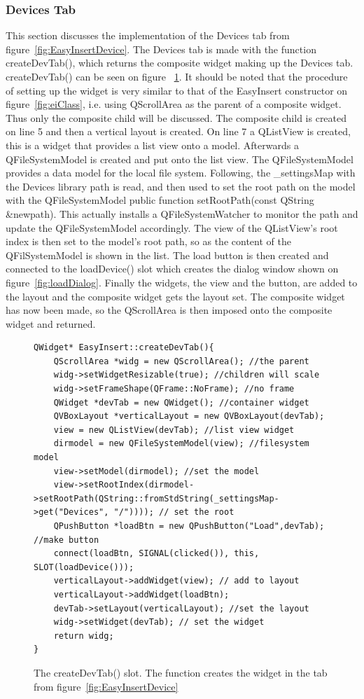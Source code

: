 \subsubsection{Devices Tab}
\label{sec:DeviceTab}
This section discusses the implementation of the Devices tab from figure~\ref{fig:EasyInsertDevice}. The Devices tab is made with the function createDevTab(), which returns the composite widget making up the Devices tab. createDevTab() can be seen on figure ~\ref{fig:deviceTabCode}.
It should be noted that the procedure of setting up the widget is very similar to that of the EasyInsert constructor on figure~\ref{fig:eiClass}, i.e. using QScrollArea as the parent of a composite widget. Thus only the composite child will be discussed.  The composite child is created on line 5 and then a vertical layout is created. On line 7 a QListView is created, this is a widget that provides a list view onto a model. Afterwards a QFileSystemModel is created and put onto the list view. The QFileSystemModel provides a data model for the local file system. Following, the \_settingsMap with the Devices library path is read, and then used to set the root path on the model with the QFileSystemModel public function setRootPath(const QString \&newpath). This actually installs a QFileSystemWatcher to monitor the path and update the QFileSystemModel accordingly. The view of the QListView's root index is then set to the model's root path, so as the content of the QFilSystemModel is shown in the list. The load button is then created and connected to the loadDevice() slot which creates the dialog window shown on figure~\ref{fig:loadDialog}. Finally the widgets, the view and the button, are added to the layout and the composite widget gets the layout set. The composite widget has now been made, so the QScrollArea is then imposed onto the composite widget and returned. 

\begin{figure}[h] %
\centering
\lstset{language=C++} 
\begin{lstlisting}[frame=single]  
QWidget* EasyInsert::createDevTab(){
	QScrollArea *widg = new QScrollArea(); //the parent 
	widg->setWidgetResizable(true); //children will scale 
	widg->setFrameShape(QFrame::NoFrame); //no frame 
	QWidget *devTab = new QWidget(); //container widget
	QVBoxLayout *verticalLayout = new QVBoxLayout(devTab); 
	view = new QListView(devTab); //list view widget
	dirmodel = new QFileSystemModel(view); //filesystem model
	view->setModel(dirmodel); //set the model
	view->setRootIndex(dirmodel->setRootPath(QString::fromStdString(_settingsMap->get("Devices", "/")))); // set the root
	QPushButton *loadBtn = new QPushButton("Load",devTab); //make button
	connect(loadBtn, SIGNAL(clicked()), this, SLOT(loadDevice())); 
	verticalLayout->addWidget(view); // add to layout
	verticalLayout->addWidget(loadBtn);
	devTab->setLayout(verticalLayout); //set the layout
	widg->setWidget(devTab); // set the widget
	return widg;
}
\end{lstlisting}
\caption{The createDevTab() slot. The function creates the widget in the tab from figure~\ref{fig:EasyInsertDevice}}
\label{fig:deviceTabCode} 	
\end{figure}

